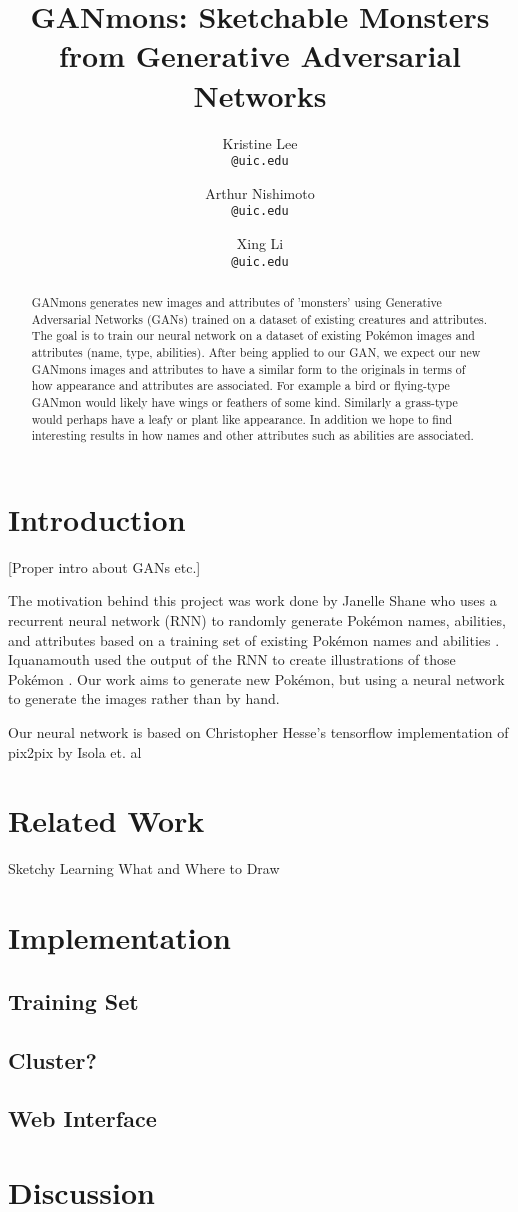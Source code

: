 \documentclass[[11pt]{article}
\title{GANmons: Sketchable Monsters from Generative Adversarial Networks}
\author{ 
Kristine Lee \\ \texttt{@uic.edu}
\and
Arthur Nishimoto \\ \texttt{@uic.edu}
\and
Xing Li \\ \texttt{@uic.edu}
}
\begin{document}
\maketitle

\begin{abstract}
GANmons generates new images and attributes of 'monsters' using Generative Adversarial Networks (GANs) trained on a dataset of existing creatures and attributes. The goal is to train our neural network on a dataset of existing Pokémon images and attributes (name, type, abilities). After being applied to our GAN, we expect our new GANmons images and attributes to have a similar form to the originals in terms of how appearance and attributes are associated. For example a bird or flying-type GANmon would likely have wings or feathers of some kind. Similarly a grass-type would perhaps have a leafy or plant like appearance. In addition we hope to find interesting results in how names and other attributes such as abilities are associated.
\end{abstract}

\section{Introduction}
[Proper intro about GANs etc.]

The motivation behind this project was work done by Janelle Shane who uses a recurrent neural network (RNN) to randomly generate  Pokémon names, abilities, and attributes based on a training set of existing Pokémon names and abilities \cite{pokemonNN}. Iquanamouth used the output of the RNN to create illustrations of those Pokémon  \cite{pokemonNN-img}. Our work aims to generate new Pokémon, but using a neural network to generate the images rather than by hand.

Our neural network is based on Christopher Hesse's tensorflow implementation of pix2pix by Isola et. al \cite{pix2pix-tensorflow,pix2pix}

\section{Related Work}
Sketchy \cite{sketchy}
Learning What and Where to Draw \cite{whatWhereToDraw}

\section{Implementation}
\subsection{Training Set}
\subsection{Cluster?}
\subsection{Web Interface}
\section{Discussion}




\end{document}
